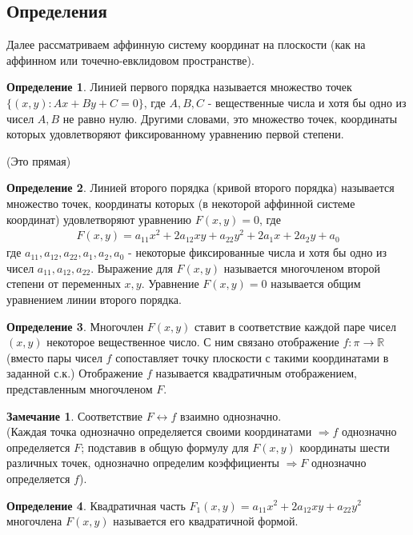 \documentclass[a4paper, 12pt]{article}
\theoremstyle{definition}
\newtheorem*{definition}{Определение}
\newtheorem*{remark}{Замечание}
\begin{document}
	\subsection{Определения}
	Далее рассматриваем аффинную систему координат на плоскости (как на аффинном или точечно-евклидовом пространстве).
	\begin{definition}
		Линией первого порядка называется множество точек $\{(x, y): Ax + By + C =0\}$, где $A, B, C$ - вещественные числа и хотя бы одно из чисел $A, B$ не равно нулю. Другими словами, это множество точек, координаты которых удовлетворяют фиксированному уравнению первой степени.
	\end{definition}
	(Это прямая)
	\begin{definition}
		Линией второго порядка (кривой второго порядка) называется множество точек, координаты которых (в некоторой аффинной системе координат) удовлетворяют уравнению $F(x, y) = 0$, где \begin{align*}
			F(x, y) = a_{11}x^2 + 2a_{12}xy + a_{22}y^2 + 2a_{1}x + 2a_{2}y + a_{0}
		\end{align*}
		где $a_{11}, a_{12}, a_{22} , a_1, a_2, a_0$ - некоторые фиксированные числа и хотя бы одно из чисел $a_{11}, a_{12}, a_{22}$. Выражение для $F(x, y)$ называется многочленом второй степени от переменных $x, y$. Уравнение $F(x, y) = 0$ называется общим уравнением линии второго порядка.
	\end{definition}
	\begin{definition}
		Многочлен $F(x, y)$ ставит в соответствие каждой паре чисел $(x, y)$ некоторое вещественное число. С ним связано отображение $f: \pi \rightarrow \mathbb{R}$ (вместо пары чисел $f$ сопоставляет точку плоскости с такими координатами в заданной с.к.) Отображение $f$ называется квадратичным отображением, представленным многочленом $F$.
	\end{definition}
	\begin{remark}
		Соответствие $F \leftrightarrow f$ взаимно однозначно.\\
		(Каждая точка однозначно определяется своими координатами $\Rightarrow f$ однозначно определяется $F$; подставив в общую формулу для $F(x, y)$ координаты шести различных точек, однозначно определим коэффициенты $\Rightarrow F$ однозначно определяется $f$).
	\end{remark}
	\begin{definition}
		Квадратичная часть $F_1(x, y) = a_{11}x^2 + 2a_{12}xy + a_{22}y^2$ многочлена $F(x, y)$ называется его квадратичной формой.
	\end{definition}
\end{document}
